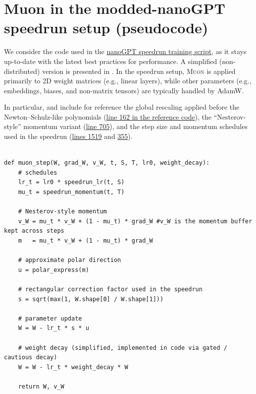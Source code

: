 \documentclass{article}
\theoremstyle{plain}
\theoremstyle{definition}
\theoremstyle{remark}
\newcommand{\Muon}{\textsc{Muon}}
\begin{document}



\newpage
\appendix
\onecolumn

\section{Muon in the modded-nanoGPT speedrun setup (pseudocode)}
\label{app:muon-pseudocode}

We consider the code used in the \href{https://github.com/KellerJordan/modded-nanogpt/blob/7d502b97dac8b8116b675dd6d670cf3ea8ec0037/train_gpt.py}{nanoGPT speedrun training script}, as it 
stays up-to-date with the latest best practices for performance. A simplified (non-distributed) version is presented in . In the speedrun setup, \Muon{} is applied primarily to 2D weight matrices
(e.g., linear layers), while other parameters (e.g., embeddings, biases, and
non-matrix tensors) are typically handled by AdamW. 

In particular, 
 and  
include for reference the global rescaling applied before the Newton--Schulz-like polynomials (\href{https://github.com/KellerJordan/modded-nanogpt/blob/7d502b97dac8b8116b675dd6d670cf3ea8ec0037/train_gpt.py#L162}{line 162 in the reference code}), the ``Nesterov-style'' momentum 
variant (\href{https://github.com/KellerJordan/modded-nanogpt/blob/7d502b97dac8b8116b675dd6d670cf3ea8ec0037/train_gpt.py#L705}{line 705}), and the step size and
momentum schedules used in the speedrun (\href{https://github.com/KellerJordan/modded-nanogpt/blob/7d502b97dac8b8116b675dd6d670cf3ea8ec0037/train_gpt.py#L1519}{lines 1519} 
and 
\href{https://github.com/KellerJordan/modded-nanogpt/blob/7d502b97dac8b8116b675dd6d670cf3ea8ec0037/train_gpt.py#L355}{355}).


\begin{lstlisting}[style=pyalgo, caption={Muon update as used in the modded-nanoGPT speedrun (simplified, per-matrix view)}, label={alg:muon-speedrun}]

def muon_step(W, grad_W, v_W, t, S, T, lr0, weight_decay):
    # schedules
    lr_t = lr0 * speedrun_lr(t, S)
    mu_t = speedrun_momentum(t, T)

    # Nesterov-style momentum
    v_W = mu_t * v_W + (1 - mu_t) * grad_W #v_W is the momentum buffer kept across steps
    m   = mu_t * v_W + (1 - mu_t) * grad_W

    # approximate polar direction
    u = polar_express(m)

    # rectangular correction factor used in the speedrun
    s = sqrt(max(1, W.shape[0] / W.shape[1]))

    # parameter update
    W = W - lr_t * s * u

    # weight decay (simplified, implemented in code via gated / cautious decay)
    W = W - lr_t * weight_decay * W

    return W, v_W
\end{lstlisting}
\end{document}

